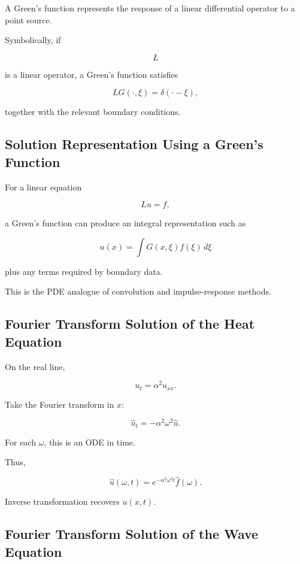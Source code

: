 A Green's function represents the response of a linear differential
operator to a point source.

Symbolically, if

\[
L
\]

is a linear operator, a Green's function satisfies

\[
\boxed{
L G(\cdot,\xi)
=
\delta(\cdot-\xi),
}
\]

together with the relevant boundary conditions.

\subsection{Solution Representation Using a Green's Function}
\label{subsec:greens-function-representation}

For a linear equation

\[
L u=f,
\]

a Green's function can produce an integral representation such as

\[
\boxed{
u(x)
=
\int
G(x,\xi)
f(\xi)
\,d\xi
}
\]

plus any terms required by boundary data.

This is the PDE analogue of convolution and impulse-response methods.

\subsection{Fourier Transform Solution of the Heat Equation}
\label{subsec:fourier-heat-equation}

On the real line,

\[
u_t
=
\alpha^2u_{xx}.
\]

Take the Fourier transform in \(x\):

\[
\boxed{
\widehat{u}_t
=
-\alpha^2\omega^2
\widehat{u}.
}
\]

For each \(\omega\), this is an ODE in time.

Thus,

\[
\boxed{
\widehat{u}(\omega,t)
=
e^{-\alpha^2\omega^2t}
\widehat{f}(\omega).
}
\]

Inverse transformation recovers \(u(x,t)\).

\subsection{Fourier Transform Solution of the Wave Equation}
\label{subsec:fourier-wave-equation}

